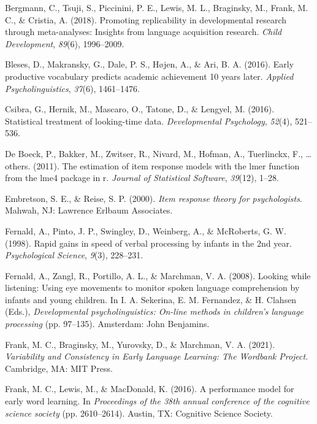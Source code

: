 \documentclass[10pt, letterpaper]{article}
\begin{document}
\leavevmode\hypertarget{ref-Bergmann2018}{}%
Bergmann, C., Tsuji, S., Piccinini, P. E., Lewis, M. L., Braginsky, M.,
Frank, M. C., \& Cristia, A. (2018). Promoting replicability in
developmental research through meta-analyses: Insights from language
acquisition research. \emph{Child Development}, \emph{89}(6),
1996--2009.

\leavevmode\hypertarget{ref-Bleses2016}{}%
Bleses, D., Makransky, G., Dale, P. S., Højen, A., \& Ari, B. A. (2016).
Early productive vocabulary predicts academic achievement 10 years
later. \emph{Applied Psycholinguistics}, \emph{37}(6), 1461--1476.

\leavevmode\hypertarget{ref-Csibra2016}{}%
Csibra, G., Hernik, M., Mascaro, O., Tatone, D., \& Lengyel, M. (2016).
Statistical treatment of looking-time data. \emph{Developmental
Psychology}, \emph{52}(4), 521--536.

\leavevmode\hypertarget{ref-de-boeck2011}{}%
De Boeck, P., Bakker, M., Zwitser, R., Nivard, M., Hofman, A.,
Tuerlinckx, F., \ldots{} others. (2011). The estimation of item response
models with the lmer function from the lme4 package in r. \emph{Journal
of Statistical Software}, \emph{39}(12), 1--28.

\leavevmode\hypertarget{ref-embretson2000}{}%
Embretson, S. E., \& Reise, S. P. (2000). \emph{Item response theory for
psychologists}. Mahwah, NJ: Lawrence Erlbaum Associates.

\leavevmode\hypertarget{ref-fernald1998}{}%
Fernald, A., Pinto, J. P., Swingley, D., Weinberg, A., \& McRoberts, G.
W. (1998). Rapid gains in speed of verbal processing by infants in the
2nd year. \emph{Psychological Science}, \emph{9}(3), 228--231.

\leavevmode\hypertarget{ref-Fernald2008}{}%
Fernald, A., Zangl, R., Portillo, A. L., \& Marchman, V. A. (2008).
Looking while listening: Using eye movements to monitor spoken language
comprehension by infants and young children. In I. A. Sekerina, E. M.
Fernandez, \& H. Clahsen (Eds.), \emph{Developmental psycholinguistics:
On-line methods in children's language processing} (pp. 97--135).
Amsterdam: John Benjamins.

\leavevmode\hypertarget{ref-frank2021}{}%
Frank, M. C., Braginsky, M., Yurovsky, D., \& Marchman, V. A. (2021).
\emph{Variability and Consistency in Early Language Learning: The
Wordbank Project}. Cambridge, MA: MIT Press.

\leavevmode\hypertarget{ref-frank2016b}{}%
Frank, M. C., Lewis, M., \& MacDonald, K. (2016). A performance model
for early word learning. In \emph{Proceedings of the 38th annual
conference of the cognitive science society} (pp. 2610--2614). Austin,
TX: Cognitive Science Society.
\end{document}
